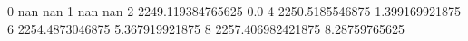0 nan nan
1 nan nan
2 2249.119384765625 0.0
4 2250.5185546875 1.399169921875
6 2254.4873046875 5.367919921875
8 2257.406982421875 8.28759765625

